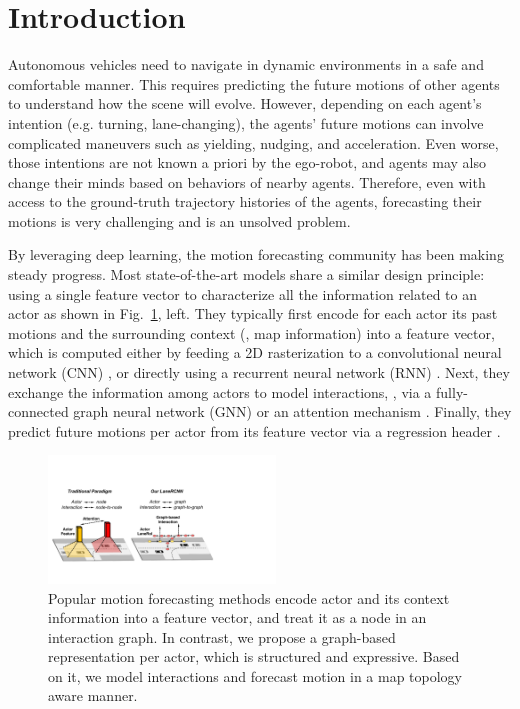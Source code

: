 \section{Introduction}
Autonomous vehicles need to navigate in dynamic environments in a safe and comfortable manner.  
This requires predicting the future motions of other agents to understand how the 
scene will evolve. 
However, depending on each agent's intention (e.g. turning, lane-changing), the agents' future motions can involve complicated maneuvers such as yielding, nudging, and acceleration.
Even worse, those intentions are not known a priori by the ego-robot, and agents may also change their minds based on behaviors of nearby agents. 
Therefore, even with access to the ground-truth trajectory histories of the agents,
forecasting their motions is very challenging and is an unsolved problem.

By leveraging deep learning, the motion forecasting community has been making steady progress. 
Most state-of-the-art models share a similar design principle: using a single feature
vector to characterize all the information related to an actor as shown in Fig.~\ref{fig:teaser}, left.
They typically first encode for each actor
its past motions and the surrounding context (\eg, map information) into a feature
vector, which is computed either by feeding a 2D rasterization to a
convolutional neural network (CNN)
\cite{nmp,dsd,precog,chauffeurnet,covernet,intentnet}, or directly using a
recurrent neural network (RNN)
\cite{matf,mfp,vectornet,tnt,sociallstm}.
Next, they exchange the information among actors to model interactions, \eg, via a fully-connected
graph neural network (GNN)
\cite{v2vnet,spagnn,precog,mfp,vectornet} or an attention
mechanism \cite{interacttransformer,sophie,socialatt,carnet,mercat2020multi}. 
Finally, they predict future motions per actor from its feature vector
via a regression header \cite{nmp,lgn,mfp,precog,pnpnet,attnmp}.


\begin{figure}[t]
\begin{center}
  \includegraphics[height=3.4cm]{figures/teaser.pdf}
\end{center}
\vspace{-0.2cm}
\caption{Popular motion forecasting methods encode actor and its context
information into a feature vector, and treat it as a node in an interaction graph.
In contrast, we propose a graph-based
representation \ROI per actor, which is structured and expressive. Based on
it, we model interactions and forecast motion in a map topology aware manner.}
\vspace{-0.2cm}
\label{fig:teaser}
\vspace{-0.2cm}
\end{figure}



